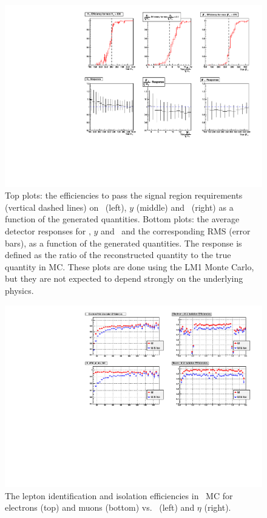 \begin{figure}[tbh]
\begin{center}
\includegraphics[width=\linewidth]{plots/lm1_SelectionEfficiency.pdf}
\caption{\label{fig:response} 
Top plots: the efficiencies to pass the signal region requirements (vertical dashed lines) on \Ht\ (left), $y$ (middle) and \met\ (right) as a function
of the generated quantities. Bottom plots: the average detector responses for \Ht, $y$ and \met\ and the corresponding RMS (error bars), as a function 
of the generated quantities. The response is defined as the ratio of the reconstructed quantity
to the true quantity in MC.  These plots are done using the LM1
Monte Carlo, but they are not expected to depend strongly on 
the underlying physics.
}
\end{center}
\end{figure}

\begin{figure}[tbh]
\begin{center}
\includegraphics[width=\linewidth]{plots/ttdil_leptonEfficiencies.pdf}
\caption{\label{fig:leptoneff} 
The lepton identification and isolation efficiencies in \ttbar\ MC for electrons (top) and muons (bottom)
vs. \pt\ (left) and $\eta$ (right).
}
\end{center}
\end{figure}

